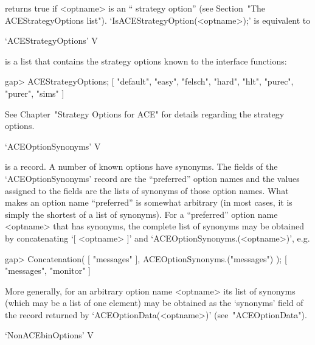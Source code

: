 returns true if <optname> is  an  ``{\ACE}  strategy  option''  (see
Section~"The                ACEStrategyOptions                 list").
`IsACEStrategyOption(<optname>);' is equivalent to

\)


\>`ACEStrategyOptions' V

is a {\GAP} list that contains  the  strategy  options  known  to  the
{\ACE} interface functions:

\beginexample
gap> ACEStrategyOptions;
[ "default", "easy", "felsch", "hard", "hlt", "purec", "purer", "sims" ]
\endexample

See Chapter~"Strategy Options  for  ACE"  for  details  regarding  the
{\ACE} strategy options.


\>`ACEOptionSynonyms' V

is a {\GAP} record. A number of known {\ACE}  options  have  synonyms.
The fields of the `ACEOptionSynonyms'  record  are  the  ``preferred''
option names and the values assigned to the fields are  the  lists  of
synonyms  of  those  option  names.  What   makes   an   option   name
``preferred'' is somewhat arbitrary (in most cases, it is  simply  the
shortest of a list of  synonyms).  For  a  ``preferred''  option  name
<optname> that has synonyms, the complete  list  of  synonyms  may  be
obtained     by     concatenating     `[     <optname>     ]'      and
`ACEOptionSynonyms.(<optname>)', e.g.

\beginexample
gap> Concatenation( [ "messages" ], ACEOptionSynonyms.("messages") );
[ "messages", "monitor" ]
\endexample

More generally, for an arbitrary option name  <optname>  its  list  of
synonyms (which may be a list of one element) may be obtained  as  the
`synonyms' field of the record returned by  `ACEOptionData(<optname>)'
(see~"ACEOptionData").


\>`NonACEbinOptions' V

